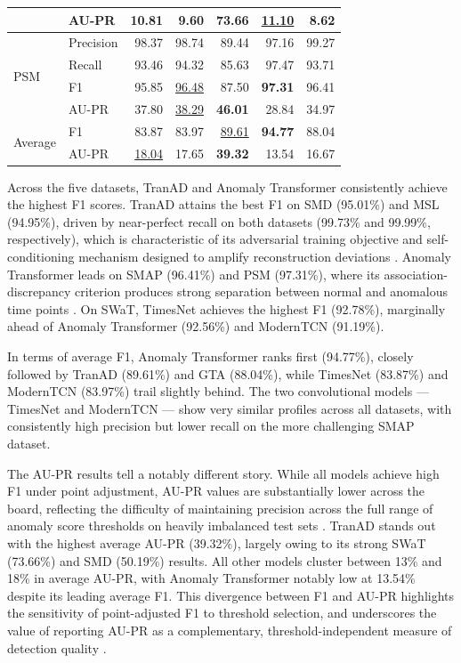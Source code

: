 \documentclass[twoside,11pt,openright]{report}
\begin{document}
\begin{table}[ht]
\begin{tabular}{ll rrrrr}
    & AU-PR     & 10.81 &  9.60 & \textbf{73.66} & \underline{11.10} &  8.62 \\
\midrule
\multirow{4}{*}{PSM}
    & Precision & 98.37 & 98.74 & 89.44 & 97.16 & 99.27 \\
    & Recall    & 93.46 & 94.32 & 85.63 & 97.47 & 93.71 \\
    & F1        & 95.85 & \underline{96.48} & 87.50 & \textbf{97.31} & 96.41 \\
    & AU-PR     & 37.80 & \underline{38.29} & \textbf{46.01} & 28.84 & 34.97 \\
\midrule
\multirow{2}{*}{Average}
    & F1        & 83.87 & 83.97 & \underline{89.61} & \textbf{94.77} & 88.04 \\
    & AU-PR     & \underline{18.04} & 17.65 & \textbf{39.32} & 13.54 & 16.67 \\
\bottomrule
\end{tabular}
\end{table}

Across the five datasets, TranAD \citep{tranad2022} and Anomaly Transformer \citep{anomalytransformer2022} consistently achieve the highest F1 scores. 
TranAD attains the best F1 on SMD (95.01\%) and MSL (94.95\%), driven by near-perfect recall on both datasets (99.73\% and 99.99\%, respectively), 
which is characteristic of its adversarial training objective and self-conditioning mechanism designed to amplify reconstruction deviations \citep{tranad2022}. 
Anomaly Transformer leads on SMAP (96.41\%) and PSM (97.31\%), where its association-discrepancy criterion produces strong separation between normal and 
anomalous time points \citep{anomalytransformer2022}. On SWaT, TimesNet achieves the highest F1 (92.78\%), marginally ahead of Anomaly Transformer (92.56\%) and ModernTCN (91.19\%).

In terms of average F1, Anomaly Transformer ranks first (94.77\%), closely followed by TranAD (89.61\%) and GTA (88.04\%), while TimesNet (83.87\%) 
and ModernTCN (83.97\%) trail slightly behind. The two convolutional models --- TimesNet \citep{timesnet2023} and ModernTCN \citep{moderntcn2024} 
--- show very similar profiles across all datasets, with consistently high precision but lower recall on the more challenging SMAP dataset.

The AU-PR results tell a notably different story. While all models achieve high F1 under point adjustment, AU-PR values are substantially lower across 
the board, reflecting the difficulty of maintaining precision across the full range of anomaly score thresholds on heavily imbalanced test sets 
\citep{darban2024survey}. TranAD stands out with the highest average AU-PR (39.32\%), largely owing to its strong SWaT (73.66\%) and SMD (50.19\%) results. 
All other models cluster between 13\% and 18\% in average AU-PR, with Anomaly Transformer notably low at 13.54\% despite its leading average F1. This divergence 
between F1 and AU-PR highlights the sensitivity of point-adjusted F1 to threshold selection, and underscores the value of reporting AU-PR as a complementary, 
threshold-independent measure of detection quality \citep{darban2024survey}.
\end{document}
